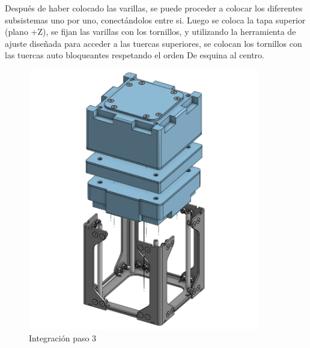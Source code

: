       Después de haber colocado las varillas, se puede
      proceder a colocar los diferentes subsistemas uno por uno, conectándolos entre si. Luego
      se coloca la tapa superior (plano +Z), se fijan las varillas con los tornillos, y utilizando la
      herramienta de ajuste diseñada para acceder a las tuercas superiores, se colocan los tornillos
      con las tuercas auto bloqueantes respetando el orden De esquina al centro.

      \begin{figure}[H]
        \begin{minipage}{0.49\textwidth}
          \centering
          \includegraphics[width=0.9\textwidth]{image/structure/integracion3.png}
          \caption{Integración paso 3}
          \label{fig:integracion3}
        \end{minipage}
        \begin{minipage}{0.49\textwidth}
          \centering

\end{minipage}
\end{figure}
